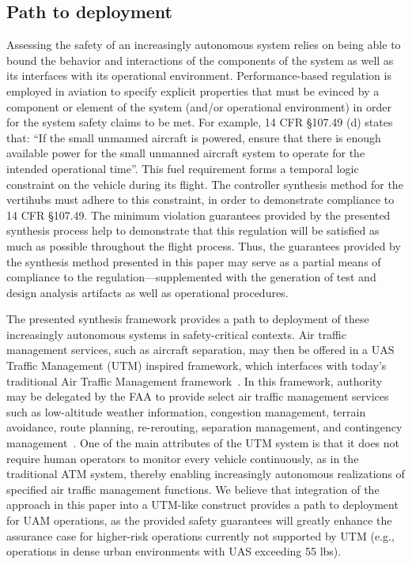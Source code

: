 \subsection{Path to deployment}

Assessing the safety of an increasingly autonomous system relies on being able to bound the behavior and interactions of the components of the system as well as its interfaces with its operational environment. Performance-based regulation is employed in aviation to specify explicit properties that must be evinced by a component or element of the system (and/or operational environment) in order for the system safety claims to be met.  For example, 14 CFR \S 107.49 (d) states that: “If the small unmanned aircraft is powered, ensure that there is enough available power for the small unmanned aircraft system to operate for the intended operational time”.  This fuel requirement forms a temporal logic constraint on the vehicle during its flight. The controller synthesis method for the vertihubs must adhere to this constraint, in order to demonstrate compliance to 14 CFR \S 107.49.  The minimum violation guarantees provided by the presented synthesis process help to demonstrate that this regulation will be satisfied as much as possible throughout the flight process.  Thus, the guarantees provided by the synthesis method presented in this paper may serve as a partial means of compliance to the regulation---supplemented with the generation of test and design analysis artifacts as well as operational procedures.

The presented synthesis framework provides a path to deployment of these increasingly autonomous systems in safety-critical contexts.  Air traffic management services, such as aircraft separation, may then be offered in a UAS Traffic Management (UTM) inspired framework, which interfaces with today’s traditional Air Traffic Management framework~\cite{PRKRJJ2016}. In this framework,  authority may be delegated by the FAA to provide select air traffic management services such as low-altitude weather information, congestion management, terrain avoidance, route planning, re-rerouting, separation management, and contingency management~\cite{MBYDLGMC2018,NCDDASC2018}.  One of the main attributes of the UTM system is that it does not require human operators to monitor every vehicle continuously, as in the traditional ATM system, thereby enabling increasingly autonomous realizations of specified air traffic management functions.  %
We believe that integration of the approach in this paper into a UTM-like construct provides a path to deployment for UAM operations, as the provided safety guarantees will greatly enhance the assurance case for higher-risk operations currently not supported by UTM (e.g., operations in dense urban environments with UAS exceeding 55 lbs).


